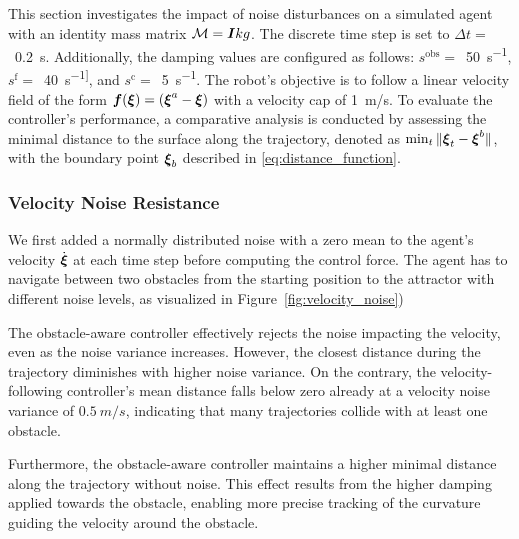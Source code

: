 This section investigates the impact of noise disturbances on a simulated agent with an identity mass matrix $\mathcal{M} = \boldsymbol{I} kg$. The discrete time step is set to $\Delta t = $~\qty{0.2}{s}. Additionally, the damping values are configured as follows: 
$s^{\mathrm{obs}}=$~\qty{50}{s^{-1}},
$s^{\mathrm{f}}=$~\qty{40}{s^{-1]}}, and
$s^{\mathrm{c}}=$~\qty{5}{s^{-1}}.
The robot's objective is to follow a linear velocity field of the form $\boldsymbol{f}(\boldsymbol{\xi}) = (\boldsymbol{\xi}^a - \boldsymbol{\xi})$ with a velocity cap of \qty{1}{m/s}.
To evaluate the controller's performance, a comparative analysis is conducted by assessing the minimal distance to the surface along the trajectory, denoted as $ \min_t \| \boldsymbol{\xi}_t - \boldsymbol{\xi}^b \| $, with the boundary point $\boldsymbol{\xi}_b$ described in \eqref{eq:distance_function}. 

\subsubsection{Velocity Noise Resistance}
We first added a normally distributed noise with a zero mean to the agent's velocity $\dot{\boldsymbol{ \xi}}$ at each time step before computing the control force. The agent has to navigate between two obstacles from the starting position to the attractor with different noise levels, as visualized in Figure~\ref{fig:velocity_noise})

The obstacle-aware controller effectively rejects the noise impacting the velocity, even as the noise variance increases. However, the closest distance during the trajectory diminishes with higher noise variance. On the contrary, the velocity-following controller's mean distance falls below zero already at a velocity noise variance of $\qty{0.5}{m/s}$, indicating that many trajectories collide with at least one obstacle.

Furthermore, the obstacle-aware controller maintains a higher minimal distance along the trajectory without noise. This effect results from the higher damping applied towards the obstacle, enabling more precise tracking of the curvature guiding the velocity around the obstacle.

